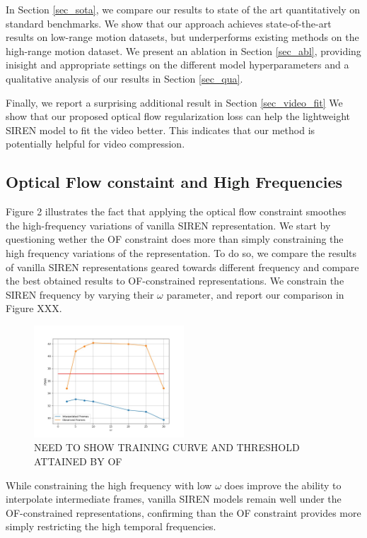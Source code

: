 \documentclass{article}
\begin{document}
In Section \ref{sec_sota}, we compare our results to state of the art quantitatively on standard benchmarks.
We show that our approach achieves state-of-the-art results on low-range motion datasets, but underperforms existing methods on the high-range motion dataset.
We present an ablation in Section \ref{sec_abl}, providing inisight and appropriate settings on the different model hyperparameters and a qualitative analysis of our results in Section \ref{sec_qua}.

Finally, we report a surprising additional result in Section \ref{sec_video_fit}
We show that our proposed optical flow regularization loss can help the lightweight SIREN model to fit the video better. 
This indicates that our method is potentially helpful for video compression.

\subsection{Optical Flow constaint and High Frequencies}
\label{sec_of_hf}
Figure 2 illustrates the fact that applying the optical flow constraint smoothes the high-frequency variations of vanilla SIREN representation.
We start by questioning wether the OF constraint does more than simply constraining the high frequency variations of the representation.
To do so, we compare the results of vanilla SIREN representations geared towards different frequency and compare the
best obtained results to OF-constrained representations.
We constrain the SIREN frequency by varying their $\omega$ parameter, and report our comparison in Figure XXX.

\begin{figure}[t]
\centering
\includegraphics[width=0.5\textwidth]{"omega_wo_of"}
\caption{NEED TO SHOW TRAINING CURVE AND THRESHOLD ATTAINED BY OF}
\end{figure}

While constraining the high frequency with low $\omega$ does improve the ability to interpolate intermediate frames,
vanilla SIREN models remain well under the OF-constrained representations,
confirming than the OF constraint provides more simply restricting the high temporal frequencies.
\end{document}
